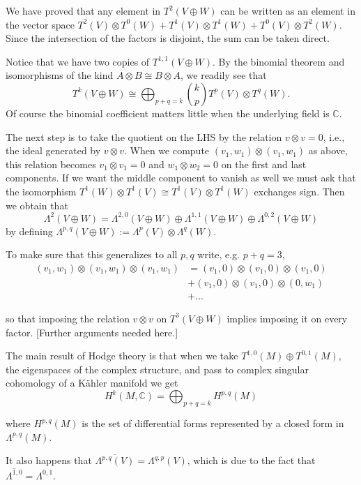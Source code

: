 \noindent
We have proved that any element in $T^2(V
\oplus W)$
can be written as an element in the vector
space
$T^2(V)\otimes T^0(W)
+ T^1(V)\otimes T^1(W)
+ T^0(V)\otimes T^2(W)$.
Since the intersection of the factors is
disjoint,
the sum can be taken direct.

\medskip\noindent
Notice that we have two copies of
$T^{1,1}(V\oplus W)$.
By the binomial theorem and isomorphisms
of the kind $A \otimes B \cong B \otimes A$,
we readily see that
 $$
T^k(V \oplus W)
\cong
\bigoplus_{p+q=k}\binom{k}{p}T^p(V)\otimes
T^q(W).
$$
Of course the binomial coefficient matters
little
when the underlying field is $\mathbb{C}$.

The next step is to take the quotient on the
LHS
by the relation $v \otimes v=0$,
i.e., the ideal generated by $v \otimes v$.
When we compute $(v_1,w_1)\otimes(v_1,w_1)$
as above,
this relation becomes $v_1 \otimes v_1=0$
and $w_1\otimes w_2=0$ on the first and last
components.
If we want the middle component to vanish as
well
we must ask that the isomorphism
$T^1(W) \otimes  T^1(V)\cong T^1(V) \otimes
T^1(W)$
exchanges sign. Then we obtain that
$$
\Lambda^2(V \oplus W)
=\Lambda^{2,0}(V\oplus W)
\oplus\Lambda^{1,1}(V\oplus W)
\oplus\Lambda^{0,2}(V \oplus W)
$$
by defining $\Lambda^{p,q}(V \oplus
W):=\Lambda^p(V)\otimes \Lambda^q(W)$.

To make sure that this generalizes to all
$p,q$
write, e.g. $p+q=3$,
$$
\begin{aligned}
(v_1,w_1)\otimes(v_1,w_1)\otimes(v_1,w_1)
&=(v_1,0)\otimes(v_1,0)\otimes(v_1,0)\\
&+(v_1,0)\otimes(v_1,0)\otimes(0,w_1)\\
&+…
\end{aligned}
$$

\noindent
so that imposing the relation $v \otimes v$
on $T^3(V \oplus W)$
implies imposing it on every factor.
[Further arguments needed here.]

\medskip\noindent
The main result of Hodge theory is that
when we take $T^{1,0}(M)\oplus T^{0,1}(M)$,
the eigenspaces of the complex structure,
and pass to complex singular cohomology of a
Kähler manifold we get
\begin{equation}
\label{equation-hodge-theorem}
H^{k}(M,\mathbb{C})
=\bigoplus_{p+q=k}H^{p,q}(M)
\end{equation}

\noindent
where $H^{p,q}(M)$ is the set of differential
forms
represented by a closed form in
$\Lambda^{p,q}(M)$.

\medskip\noindent
It also happens that
$\overline{\Lambda^{p,q}(V)}=\Lambda^{q,p}(V)
$,
which is due to the fact that
$\overline{\Lambda^{1,0}}=\Lambda^{0,1}$.


